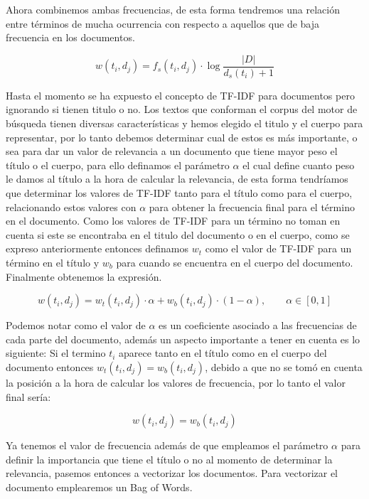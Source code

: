 \documentclass[runningheads,a4paper]{llncs}
\begin{document}
Ahora combinemos ambas frecuencias, de esta forma tendremos una relación entre términos de mucha ocurrencia con respecto a aquellos que de baja frecuencia en los documentos.

\begin{equation}
	w(t_i, d_j) = f_s(t_i, d_j) \cdot \log{\frac{|D|}{d_s(t_i) + 1}}
\end{equation}

Hasta el momento se ha expuesto el concepto de TF-IDF para documentos pero ignorando si tienen titulo o no. Los textos que conforman el corpus del motor de búsqueda tienen diversas características y hemos elegido el titulo y el cuerpo para representar, por lo tanto debemos determinar cual de estos es más importante, o sea para dar un valor de relevancia a un documento que tiene mayor peso el título o el cuerpo, para ello definamos el parámetro $\alpha$ el cual define cuanto peso le damos al título a la hora de calcular la relevancia, de esta forma tendríamos que determinar los valores de TF-IDF tanto para el título como para el cuerpo, relacionando estos valores con $\alpha$ para obtener la frecuencia final para el término en el documento. Como los valores de TF-IDF para un término no toman en cuenta si este se encontraba en el titulo del documento o en el cuerpo, como se expreso anteriormente entonces definamos $w_t$ como el valor de TF-IDF para un término en el título y $w_b$ para cuando se encuentra en el cuerpo del documento. Finalmente obtenemos la expresión.

\begin{equation}
	w(t_i, d_j) = w_t(t_i, d_j) · \alpha + w_b(t_i, d_j) · (1 - \alpha), \qquad \alpha \in [0, 1]
\end{equation}

Podemos notar como el valor de $\alpha$ es un coeficiente asociado a las frecuencias de cada parte del documento, además un aspecto importante a tener en cuenta es lo siguiente: Si el termino $t_i$ aparece tanto en el título como en el cuerpo del documento entonces $w_t(t_i, d_j) = w_b(t_i, d_j)$, debido a que no se tomó en cuenta la posición a la hora de calcular los valores de frecuencia, por lo tanto el valor final sería: 

\begin{equation}
	w(t_i, d_j) = w_b(t_i, d_j)
\end{equation}

Ya tenemos el valor de frecuencia además de que empleamos el parámetro  $\alpha$ para definir la importancia que tiene el título o no al momento de determinar la relevancia, pasemos entonces a vectorizar los documentos. Para vectorizar el documento emplearemos un Bag of Words.
\end{document}
